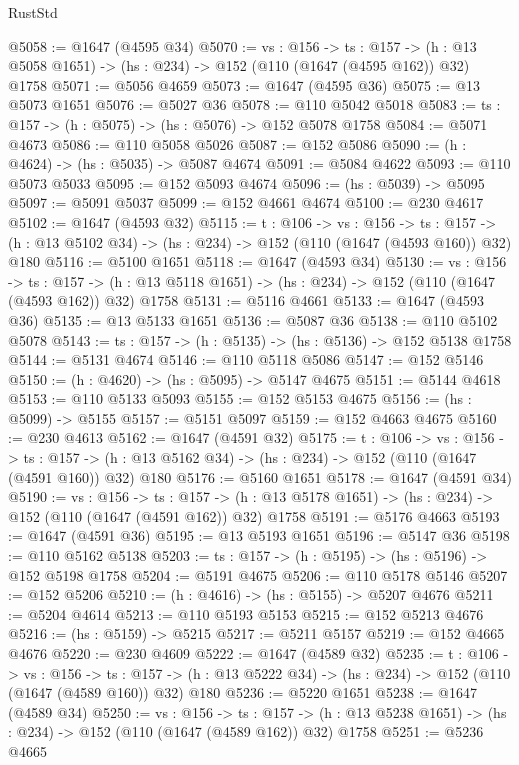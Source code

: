 \begin{lexlean}{RustStd}
\begin{coremodule}
@5058 := @1647 (@4595 @34)
@5070 := {vs : @156} ->
  {ts : @157} -> (h : @13 @5058 @1651) -> (hs : @234) -> @152 (@110 (@1647 (@4595 @162)) @32) @1758
@5071 := @5056 @4659
@5073 := @1647 (@4595 @36)
@5075 := @13 @5073 @1651
@5076 := @5027 @36
@5078 := @110 @5042 @5018
@5083 := {ts : @157} -> (h : @5075) -> (hs : @5076) -> @152 @5078 @1758
@5084 := @5071 @4673
@5086 := @110 @5058 @5026
@5087 := @152 @5086
@5090 := (h : @4624) -> (hs : @5035) -> @5087 @4674
@5091 := @5084 @4622
@5093 := @110 @5073 @5033
@5095 := @152 @5093 @4674
@5096 := (hs : @5039) -> @5095
@5097 := @5091 @5037
@5099 := @152 @4661 @4674
@5100 := @230 @4617
@5102 := @1647 (@4593 @32)
@5115 := {t : @106} ->
  {vs : @156} ->
  {ts : @157} -> (h : @13 @5102 @34) -> (hs : @234) -> @152 (@110 (@1647 (@4593 @160)) @32) @180
@5116 := @5100 @1651
@5118 := @1647 (@4593 @34)
@5130 := {vs : @156} ->
  {ts : @157} -> (h : @13 @5118 @1651) -> (hs : @234) -> @152 (@110 (@1647 (@4593 @162)) @32) @1758
@5131 := @5116 @4661
@5133 := @1647 (@4593 @36)
@5135 := @13 @5133 @1651
@5136 := @5087 @36
@5138 := @110 @5102 @5078
@5143 := {ts : @157} -> (h : @5135) -> (hs : @5136) -> @152 @5138 @1758
@5144 := @5131 @4674
@5146 := @110 @5118 @5086
@5147 := @152 @5146
@5150 := (h : @4620) -> (hs : @5095) -> @5147 @4675
@5151 := @5144 @4618
@5153 := @110 @5133 @5093
@5155 := @152 @5153 @4675
@5156 := (hs : @5099) -> @5155
@5157 := @5151 @5097
@5159 := @152 @4663 @4675
@5160 := @230 @4613
@5162 := @1647 (@4591 @32)
@5175 := {t : @106} ->
  {vs : @156} ->
  {ts : @157} -> (h : @13 @5162 @34) -> (hs : @234) -> @152 (@110 (@1647 (@4591 @160)) @32) @180
@5176 := @5160 @1651
@5178 := @1647 (@4591 @34)
@5190 := {vs : @156} ->
  {ts : @157} -> (h : @13 @5178 @1651) -> (hs : @234) -> @152 (@110 (@1647 (@4591 @162)) @32) @1758
@5191 := @5176 @4663
@5193 := @1647 (@4591 @36)
@5195 := @13 @5193 @1651
@5196 := @5147 @36
@5198 := @110 @5162 @5138
@5203 := {ts : @157} -> (h : @5195) -> (hs : @5196) -> @152 @5198 @1758
@5204 := @5191 @4675
@5206 := @110 @5178 @5146
@5207 := @152 @5206
@5210 := (h : @4616) -> (hs : @5155) -> @5207 @4676
@5211 := @5204 @4614
@5213 := @110 @5193 @5153
@5215 := @152 @5213 @4676
@5216 := (hs : @5159) -> @5215
@5217 := @5211 @5157
@5219 := @152 @4665 @4676
@5220 := @230 @4609
@5222 := @1647 (@4589 @32)
@5235 := {t : @106} ->
  {vs : @156} ->
  {ts : @157} -> (h : @13 @5222 @34) -> (hs : @234) -> @152 (@110 (@1647 (@4589 @160)) @32) @180
@5236 := @5220 @1651
@5238 := @1647 (@4589 @34)
@5250 := {vs : @156} ->
  {ts : @157} -> (h : @13 @5238 @1651) -> (hs : @234) -> @152 (@110 (@1647 (@4589 @162)) @32) @1758
@5251 := @5236 @4665

\end{coremodule}
\end{lexlean}
